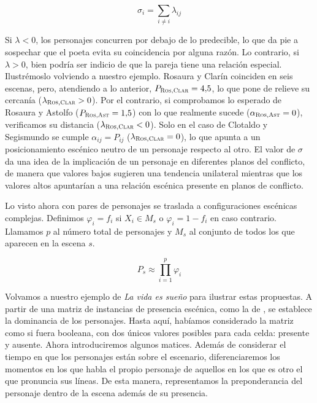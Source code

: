 \begin{equation}\label{eq:12}
	\sigma_{i} = \sum_{i \neq i}{\lambda_{ij}}
\end{equation}

Si $\lambda < 0$, los personajes concurren por debajo de lo predecible, lo que da pie a sospechar que el poeta evita su coincidencia por alguna razón. Lo contrario, si $\lambda > 0$, bien podría ser indicio de que la pareja tiene una relación especial. Ilustrémoslo volviendo a  nuestro ejemplo. Rosaura y Clarín coinciden en seis escenas, pero, atendiendo a lo anterior, $P_{\textsc{Ros},\textsc{Clar}} = 4{,}5$, lo que pone de relieve su cercanía ($\lambda_{\textsc{Ros},\textsc{Clar}}>0$). Por el contrario, si comprobamos lo esperado de Rosaura y Astolfo ($P_{\textsc{Ros},\textsc{Ast}} = 1{,}5$) con lo que realmente sucede ($\alpha_{\textsc{Ros},\textsc{Ast}} = 0 $), verificamos su distancia ($\lambda_{\textsc{Ros},\textsc{Clar}} < 0$). Solo en el caso de Clotaldo y Segismundo se cumple $\alpha_{ij} = P_{ij}$ ($\lambda_{\textsc{Ros},\textsc{Clar}} = 0$), lo que apunta a un posicionamiento escénico  neutro de un personaje respecto al otro. El valor de $\sigma$ da una idea de la implicación de un personaje en diferentes planos del conflicto, de manera que valores bajos sugieren una tendencia unilateral mientras que los valores altos apuntarían a una relación escénica presente en planos de conflicto. 

 

Lo visto ahora con pares de personajes se traslada a configuraciones escénicas complejas. Definimos $\varphi_i = f_i$ si $X_i \in M_s$ o $\varphi_i = 1 - f_i$ en caso contrario. Llamamos $p$ al número total de personajes y $M_s$ al conjunto de todos los que aparecen en la escena $s$.

\begin{equation}
	P_s \approx \prod_{i=1}^{p}  \varphi_i
\end{equation}

Volvamos a nuestro ejemplo de \textit{La vida es sueño} para ilustrar estas propuestas. A partir de una matriz de instancias de presencia escénica, como la de , se establece la dominancia de los personajes. Hasta aquí, habíamos considerado la matriz como si fuera booleana, con dos únicos valores posibles para cada celda: presente y ausente. Ahora introduciremos algunos matices. Además de considerar el tiempo en que los personajes están sobre el escenario, diferenciaremos los momentos en los que habla el propio personaje de aquellos en los que es otro el que pronuncia sus líneas. De esta manera, representamos la preponderancia del personaje dentro de la escena además de su presencia.

